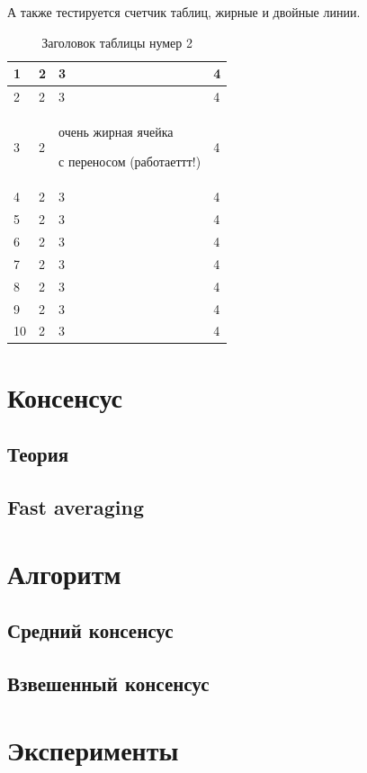 \documentclass[a4paper,article,14pt]{extarticle}
\begin{document}
А также тестируется счетчик таблиц, жирные и двойные линии.

\begin{center}
    \begin{longtable}{|p{2cm}||p{3cm}|p{7cm}|p{3cm}|}
    \caption{Заголовок таблицы нумер 2}\\
    \hline
    1 & 2 & 3 & 4\\
    \hline
    2 & 2 & 3 & 4\\
    \hline
    3 & 2 & очень жирная ячейка \par с переносом (работаеттт!) & 4\\
    \hline
    4 & 2 & 3 & 4\\
    \hline
    5 & 2 & 3 & 4\\
    \hline
    6 & 2 & 3 & 4\\
    \hline
    7 & 2 & 3 & 4\\
    \hline
    8 & 2 & 3 & 4\\
    \hline
    9 & 2 & 3 & 4\\
    \hline
    10 & 2 & 3 & 4\\
    \hline


    \end{longtable}
\end{center}

\section{Консенсус}
\subsection{Теория}
\subsection{Fast averaging}

\pagebreak
\section{Алгоритм}
\subsection{Средний консенсус}
\subsection{Взвешенный консенсус}

\section{Эксперименты}
\end{document}
